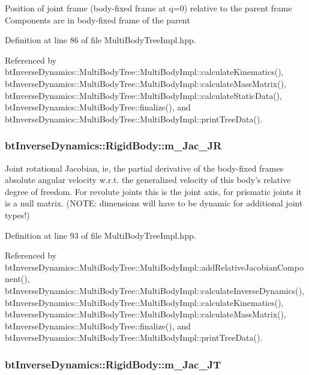 Position of joint frame (body-fixed frame at q=0) relative to the parent frame Components are in body-fixed frame of the parent 

Definition at line 86 of file MultiBodyTreeImpl.hpp.

Referenced by btInverseDynamics::MultiBodyTree::MultiBodyImpl::calculateKinematics(), btInverseDynamics::MultiBodyTree::MultiBodyImpl::calculateMassMatrix(), btInverseDynamics::MultiBodyTree::MultiBodyImpl::calculateStaticData(), btInverseDynamics::MultiBodyTree::finalize(), and btInverseDynamics::MultiBodyTree::MultiBodyImpl::printTreeData().\hypertarget{structbt_inverse_dynamics_1_1_rigid_body_5ce5299988e53be540fa03c23b8bb63e}{
\subsubsection[m\_\-Jac\_\-JR]{ {\bf btInverseDynamics::RigidBody::m\_\-Jac\_\-JR}}}
\label{structbt_inverse_dynamics_1_1_rigid_body_5ce5299988e53be540fa03c23b8bb63e}


Joint rotational Jacobian, ie, the partial derivative of the body-fixed frames absolute angular velocity w.r.t. the generalized velocity of this body's relative degree of freedom. For revolute joints this is the joint axis, for prismatic joints it is a null matrix. (NOTE: dimensions will have to be dynamic for additional joint types!) 

Definition at line 93 of file MultiBodyTreeImpl.hpp.

Referenced by btInverseDynamics::MultiBodyTree::MultiBodyImpl::addRelativeJacobianComponent(), btInverseDynamics::MultiBodyTree::MultiBodyImpl::calculateInverseDynamics(), btInverseDynamics::MultiBodyTree::MultiBodyImpl::calculateKinematics(), btInverseDynamics::MultiBodyTree::MultiBodyImpl::calculateMassMatrix(), btInverseDynamics::MultiBodyTree::finalize(), and btInverseDynamics::MultiBodyTree::MultiBodyImpl::printTreeData().\hypertarget{structbt_inverse_dynamics_1_1_rigid_body_cedf67bbb73601a34c2909136fae1187}{
\subsubsection[m\_\-Jac\_\-JT]{ {\bf btInverseDynamics::RigidBody::m\_\-Jac\_\-JT}}}
\label{structbt_inverse_dynamics_1_1_rigid_body_cedf67bbb73601a34c2909136fae1187}


